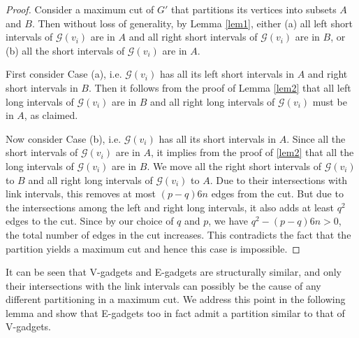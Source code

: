 \documentclass[11pt]{article}
\begin{document}
\begin{proof}
 Consider a maximum cut of $G'$ that partitions its vertices into subsets $A$ and $B$. Then without loss of generality, by Lemma \ref{lem1}, either (a) all left short intervals of $\mathcal{G}(v_i)$ are in $A$ and all right short intervals of $\mathcal{G}(v_i)$ are in $B$, or (b) all the short intervals of $\mathcal{G}(v_i)$ are in $A$. 
 
 First consider Case (a), i.e. $\mathcal{G}(v_i)$ has all its left short intervals in $A$ and right short intervals in $B$. Then it follows from the proof of Lemma \ref{lem2} that all left long intervals of $\mathcal{G}(v_i)$ are  in $B$ and all right long intervals of $\mathcal{G}(v_i)$ must be in $A$, as claimed. 
  
  Now consider Case (b), i.e. $\mathcal{G}(v_i)$ has all its short intervals in $A$.  Since all the short intervals of $\mathcal{G}(v_i)$ are in $A$, it implies from the proof of \ref{lem2} that  all the long intervals of $\mathcal{G}(v_i)$ are in $B$.  We move all the right short intervals of $\mathcal{G}(v_i)$ to $B$ and all right long intervals of $\mathcal{G}(v_i)$ to $A$. Due to their intersections with link intervals, this removes at most $(p-q)6n$ edges from the cut. But due to the intersections among the left and right long intervals, it also adds at least $q^2$ edges to the cut. Since by our choice of $q$ and $p$, we have $q^2 - (p-q)6n > 0$, the total number of edges in the cut increases. This contradicts the fact that the partition yields a maximum cut and hence this case is impossible.
\end{proof}

It can be seen that V-gadgets and E-gadgets are structurally similar, and only their intersections with the link intervals can possibly be the cause of any different partitioning in a maximum cut. We address this point in the following lemma and show that E-gadgets too in fact admit a partition similar to that of V-gadgets.
 
\end{document}
